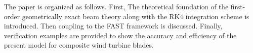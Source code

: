 \documentclass{article}
\begin{document}
The paper is organized as follows.  First, The theoretical foundation of the first-order geometrically exact beam theory along with the RK4 integration scheme is introduced. Then coupling to the FAST framework is discussed. Finally, verification examples are provided to show the accuracy and efficiency of the present model for composite wind turbine blades.  




\end{document}
